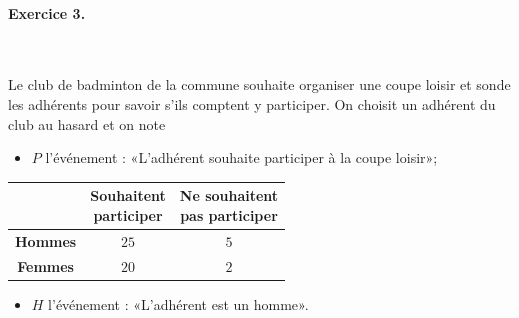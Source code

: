 \documentclass[11pt]{article}
\begin{document}
\paragraph{Exercice 3.}~\\
\begin{minipage}{.5\textwidth}
  Le club de badminton de la commune souhaite organiser une coupe loisir et
  sonde les adhérents pour savoir s'ils comptent y participer. On choisit un
  adhérent du club au hasard et on note
  \begin{itemize}
    \item $P$ l'événement : «L'adhérent souhaite participer à la coupe loisir»;
  \end{itemize}
\end{minipage}
\begin{minipage}{.5\textwidth}
\begin{center}
\renewcommand{\arraystretch}{2}
\begin{tabular}{|c|c|c|}
  \cline{2-3}
  \multicolumn{1}{c|}{} & \makecell{\textbf{Souhaitent}\\\textbf{participer}} &
  \makecell{\textbf{Ne souhaitent}\\\textbf{pas participer}} \\
  \hline
  \textbf{Hommes} & $25$ & $5$ \\
  \hline
  \textbf{Femmes} & $20$ & $2$ \\
  \hline
\end{tabular}
\end{center}
\end{minipage}
\begin{itemize}
  \item $H$ l'événement : «L'adhérent est un homme».
\end{itemize}
\end{document}
